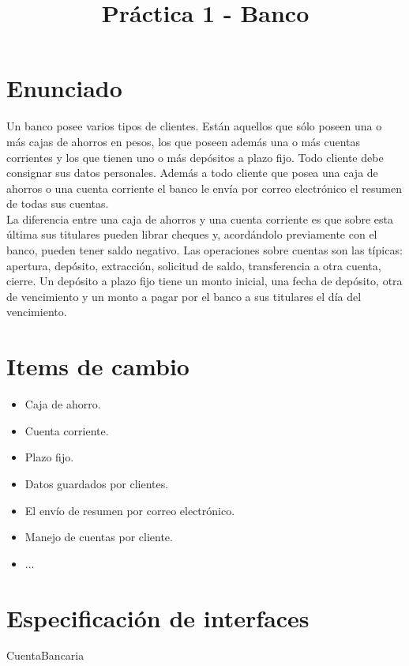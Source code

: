 \documentclass[11pt]{article}
\title{Práctica 1 - Banco}
\author{}
\date{}
\begin{document}
\maketitle

\section{Enunciado}

Un banco posee varios tipos de clientes. Están aquellos que sólo poseen una o más cajas de ahorros en pesos, los que poseen además una o más cuentas corrientes y los que tienen uno o más depósitos a plazo fijo. Todo cliente debe consignar sus datos personales. Además a todo cliente que posea una caja de ahorros o una cuenta corriente el banco le envía por correo electrónico el resumen de todas sus cuentas. \\

La diferencia entre una caja de ahorros y una cuenta corriente es que sobre esta última sus titulares pueden librar cheques y, acordándolo previamente con el banco, pueden tener saldo negativo. Las operaciones sobre cuentas son las típicas: apertura, depósito, extracción, solicitud de saldo, transferencia a otra cuenta, cierre. Un depósito a plazo fijo tiene un monto inicial, una fecha de depósito, otra de vencimiento y un monto a pagar por el banco a sus titulares el día del vencimiento.


\section{Items de cambio}

\begin{itemize}
    \item Caja de ahorro.
    \item Cuenta corriente.
    \item Plazo fijo.
    \item Datos guardados por clientes.
    \item El envío de resumen por correo electrónico.
    \item Manejo de cuentas por cliente.
    \item ...
\end{itemize}

\section{Especificación de interfaces}

\begin{module}{CuentaBancaria}

\eproc
{}

\end{module}
\end{document}
